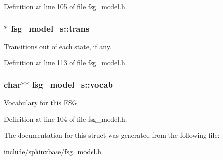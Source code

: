 Definition at line 105 of file fsg\-\_\-model.\-h.

\subsubsection[{trans}]{$\ast$ fsg\-\_\-model\-\_\-s\-::trans}\label{structfsg__model__s_ac5cd4b72818b7a9f2dc543d6a6ac9cc7}


Transitions out of each state, if any. 



Definition at line 113 of file fsg\-\_\-model.\-h.

\subsubsection[{vocab}]{\setlength{\rightskip}{0pt plus 5cm}char$\ast$$\ast$ fsg\-\_\-model\-\_\-s\-::vocab}\label{structfsg__model__s_a6bbfce2d672624d792ff964200a64031}


Vocabulary for this F\-S\-G. 



Definition at line 104 of file fsg\-\_\-model.\-h.



The documentation for this struct was generated from the following file\-:\begin{DoxyCompactItemize}
\item 
include/sphinxbase/fsg\-\_\-model.\-h\end{DoxyCompactItemize}
